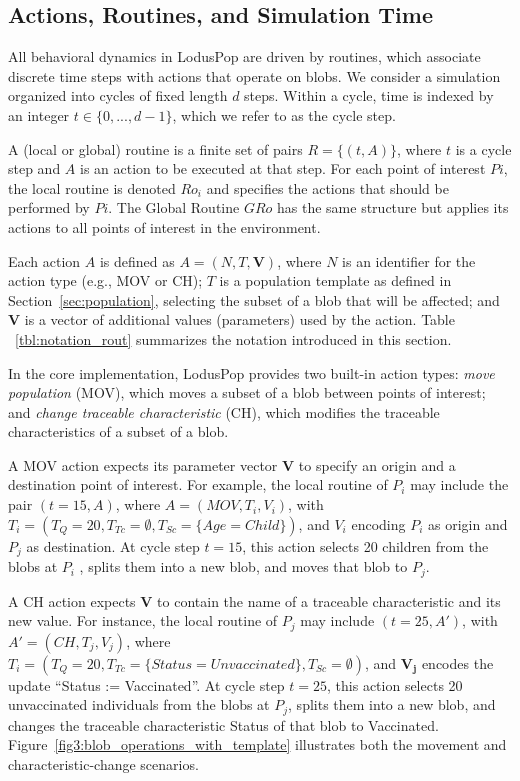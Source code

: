 \documentclass[pdflatex,sn-mathphys-num]{sn-jnl}%
\newcommand\redb[1]{#1}
\theoremstyle{thmstyleone}%
\theoremstyle{thmstyletwo}%
\theoremstyle{thmstylethree}%
\begin{document}
\subsection{Actions, Routines, and Simulation Time}
\label{sec:routines}

\redb{All behavioral dynamics in LodusPop are driven by routines, which associate discrete time steps with actions that operate on blobs.
We consider a simulation organized into cycles of fixed length 
$d$ steps. Within a cycle, time is indexed by an integer $t \in \{0, ..., d-1\}$, which we refer to as the cycle step. 

A (local or global) routine is a finite set of pairs $R = \{(t, A)\}$, where $t$ is a cycle step and $A$ is an action to be executed at that step.
For each point of interest $Pi$, the local routine is denoted $Ro_i$ and specifies the actions that should be performed by $Pi$.
The Global Routine $GRo$ has the same structure but applies its actions to all points of interest in the environment.

Each action $A$ is defined as $A = (N, T, \bm{V})$, where $N$ is an identifier for the action type (e.g., MOV or CH); $T$ is a population template as defined in Section~\ref{sec:population}, selecting the subset of a blob that will be affected; and $\bm{V}$ is a vector of additional values (parameters) used by the action. 
Table ~\ref{tbl:notation_rout} summarizes the notation introduced in this section.

In the core implementation, LodusPop provides two built-in action types:
\textit{move population} (MOV), which moves a subset of a blob between points of interest; and \textit{change traceable characteristic} (CH), which modifies the traceable characteristics of a subset of a blob.

A MOV action expects its parameter vector $\bm{V}$ to specify an origin and a destination point of interest. For example, the local routine of $P_i$ may include the pair $(t = 15, A)$, where $A = (MOV, T_i, V_i)$, with $T_i=(T_Q=20, T_{Tc}=\emptyset, T_{Sc}=\{Age=Child\})$, and $V_i$ encoding $P_i$ as origin and $P_j$ as destination. At cycle step $t = 15$, this action selects 20 children from the blobs at $P_i$ , splits them into a new blob, and moves that blob to 
$P_j$.

A CH action expects $\bm{V}$ to contain the name of a traceable characteristic and its new value. For instance, the local routine of $P_j$ may include $(t = 25, A')$, with $A' = (CH, T_j, V_j)$, where $T_i=(T_Q=20, T_{Tc}=\{Status=Unvaccinated\}, T_{Sc}=\emptyset)$, and $\bm{V_j}$ encodes the update ``Status := Vaccinated''. At cycle step $t=25$, this action selects 20 unvaccinated individuals from the blobs at $P_j$, splits them into a new blob, and changes the traceable characteristic Status of that blob to Vaccinated. Figure~\ref{fig3:blob_operations_with_template} illustrates both the movement and characteristic-change scenarios.

}
\end{document}
